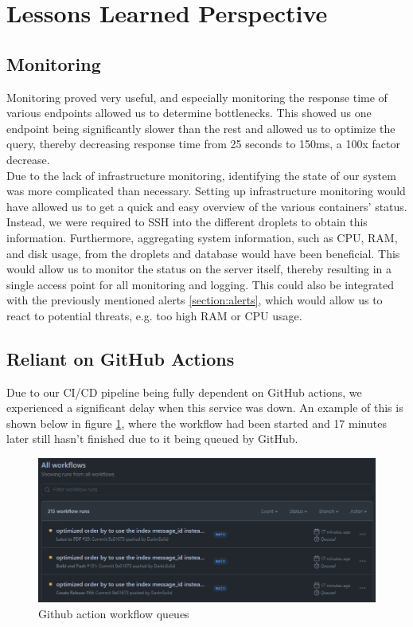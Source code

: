 \section{Lessons Learned Perspective}
\subsection{Monitoring} \label{section:llmonitoring}
Monitoring proved very useful, and especially monitoring the response time of various endpoints allowed us to determine bottlenecks. This showed us one endpoint being significantly slower than the rest and allowed us to optimize the query, thereby decreasing response time from 25 seconds to 150ms, a 100x factor decrease.
\\
Due to the lack of infrastructure monitoring, identifying the state of our system was more complicated than necessary. Setting up infrastructure monitoring would have allowed us to get a quick and easy overview of the various containers' status. Instead, we were required to SSH into the different droplets to obtain this information. Furthermore, aggregating system information, such as CPU, RAM, and disk usage, from the droplets and database would have been beneficial. This would allow us to monitor the status on the server itself, thereby resulting in a single access point for all monitoring and logging. This could also be integrated with the previously mentioned alerts \ref{section:alerts}, which would allow us to react to potential threats, e.g. too high RAM or CPU usage.

\subsection{Reliant on GitHub Actions}
Due to our CI/CD pipeline being fully dependent on GitHub actions, we experienced a significant delay when this service was down. An example of this is shown below in figure \ref{fig:github-action-query}, where the workflow had been started and 17 minutes later still hasn't finished due to it being queued by GitHub.
\begin{figure}[H]
    \centering
    \includegraphics[width=1\linewidth]{report/images/github-actions-queue.png}
    \caption{Github action workflow queues}
    \label{fig:github-action-query}
\end{figure}


